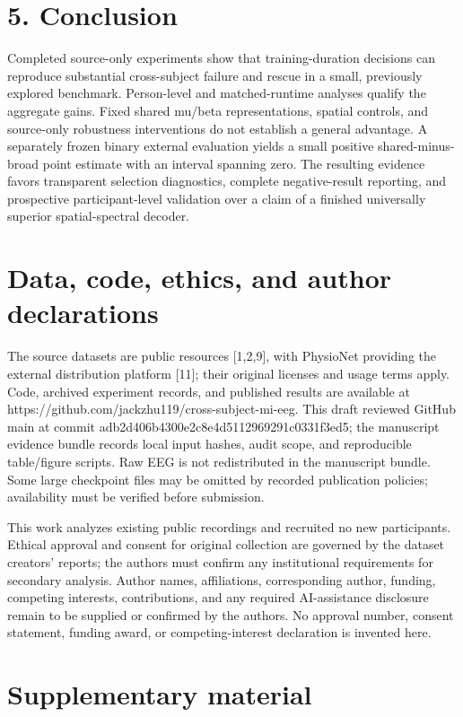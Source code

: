 \documentclass[11pt]{article}
\begin{document}
\section*{5. Conclusion}
Completed source-only experiments show that training-duration decisions can reproduce substantial cross-subject failure and rescue in a small, previously explored benchmark. Person-level and matched-runtime analyses qualify the aggregate gains. Fixed shared mu/beta representations, spatial controls, and source-only robustness interventions do not establish a general advantage. A separately frozen binary external evaluation yields a small positive shared-minus-broad point estimate with an interval spanning zero. The resulting evidence favors transparent selection diagnostics, complete negative-result reporting, and prospective participant-level validation over a claim of a finished universally superior spatial-spectral decoder.

\section*{Data, code, ethics, and author declarations}
The source datasets are public resources [1,2,9], with PhysioNet providing the external distribution platform [11]; their original licenses and usage terms apply. Code, archived experiment records, and published results are available at https://github.com/jackzhu119/cross-subject-mi-eeg. This draft reviewed GitHub main at commit adb2d406b4300e2c8e4d5112969291c0331f3ed5; the manuscript evidence bundle records local input hashes, audit scope, and reproducible table/figure scripts. Raw EEG is not redistributed in the manuscript bundle. Some large checkpoint files may be omitted by recorded publication policies; availability must be verified before submission.

This work analyzes existing public recordings and recruited no new participants. Ethical approval and consent for original collection are governed by the dataset creators' reports; the authors must confirm any institutional requirements for secondary analysis. Author names, affiliations, corresponding author, funding, competing interests, contributions, and any required AI-assistance disclosure remain to be supplied or confirmed by the authors. No approval number, consent statement, funding award, or competing-interest declaration is invented here.

\section*{Supplementary material}
\end{document}

